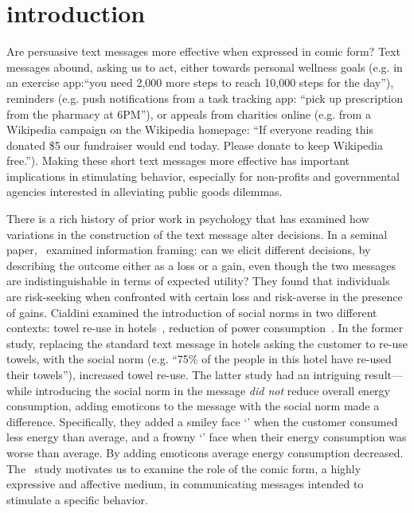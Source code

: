 \section{introduction}
\label{sec:introduction}
Are persuasive text messages more effective when expressed in comic form? Text messages abound, asking us to act, either towards personal wellness goals (e.g. in an exercise app:``you need 2,000 more steps to reach 10,000 steps for the day''), reminders (e.g. push notifications from a task tracking app: ``pick up prescription from the pharmacy at 6PM''), or appeals from charities online (e.g. from a Wikipedia campaign on the Wikipedia homepage: ``If everyone reading this donated \$5 our fundraiser would end today. Please donate to keep Wikipedia free.''). Making these short text messages more effective has important implications in stimulating behavior, especially for non-profits and governmental agencies interested in alleviating public goods dilemmas.

There is a rich history of prior work in psychology that has examined how variations in the construction of the text message alter decisions. In a seminal paper,~\textcite{tversky1981framing} examined information framing: can we elicit different decisions, by describing the outcome either as a loss or a gain, even though the two messages are indistinguishable in terms of expected utility? They found that individuals are risk-seeking when confronted with certain loss and risk-averse in the presence of gains. Cialdini examined the introduction of social norms in two different contexts: towel re-use in hotels~\parencite{goldstein2008room}, reduction of power consumption~\parencite{schultz2007constructive}. In the former study, replacing the standard text message in hotels asking the customer to re-use towels, with the social norm (e.g. ``75\% of the people in this hotel have re-used their towels''), increased towel re-use. The latter study had an intriguing result---while introducing the social norm in the message \textit{did not} reduce overall energy consumption, adding emoticons to the message with the social norm made a difference. Specifically, they added a smiley face `\smiley{}' when the customer consumed less energy than average, and a frowny `\frownie{}' face when their energy consumption was worse than average. By adding emoticons average energy consumption decreased. The~\textcite{schultz2007constructive} study motivates us to examine the role of the comic form, a highly expressive and affective medium, in communicating messages intended to stimulate a specific behavior.

